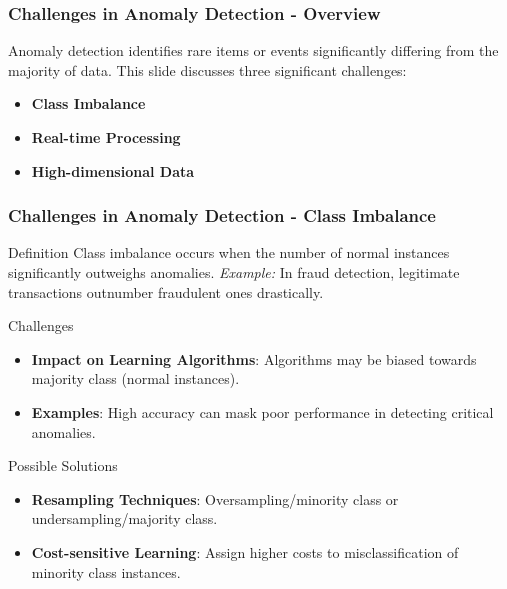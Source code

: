 \documentclass{beamer}
\begin{document}
\begin{frame}[fragile]
    \frametitle{Challenges in Anomaly Detection - Overview}
    Anomaly detection identifies rare items or events significantly differing from the majority of data. 
    This slide discusses three significant challenges:
    \begin{itemize}
        \item \textbf{Class Imbalance}
        \item \textbf{Real-time Processing}
        \item \textbf{High-dimensional Data}
    \end{itemize}
\end{frame}

\begin{frame}[fragile]
    \frametitle{Challenges in Anomaly Detection - Class Imbalance}
    \begin{block}{Definition}
        Class imbalance occurs when the number of normal instances significantly outweighs anomalies.
        \textit{Example:} In fraud detection, legitimate transactions outnumber fraudulent ones drastically.
    \end{block}

    \begin{block}{Challenges}
        \begin{itemize}
            \item \textbf{Impact on Learning Algorithms}: Algorithms may be biased towards majority class (normal instances).
            \item \textbf{Examples}: High accuracy can mask poor performance in detecting critical anomalies.
        \end{itemize}
    \end{block}

    \begin{block}{Possible Solutions}
        \begin{itemize}
            \item \textbf{Resampling Techniques}: Oversampling/minority class or undersampling/majority class.
            \item \textbf{Cost-sensitive Learning}: Assign higher costs to misclassification of minority class instances.
        \end{itemize}
    \end{block}
\end{frame}
\end{document}
